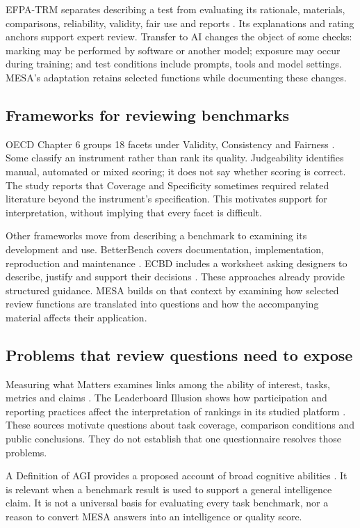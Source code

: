 \documentclass[10pt,conference]{IEEEtran}
\begin{document}
EFPA-TRM separates describing a test from evaluating its rationale, materials, comparisons, reliability, validity, fair use and reports \cite{efpa_test_review_model_2025}. Its explanations and rating anchors support expert review. Transfer to AI changes the object of some checks: marking may be performed by software or another model; exposure may occur during training; and test conditions include prompts, tools and model settings. MESA's adaptation retains selected functions while documenting these changes.

\subsection{Frameworks for reviewing benchmarks}
OECD Chapter 6 groups 18 facets under Validity, Consistency and Fairness \cite{cohn_hernandez_orallo_oecd_2023}. Some classify an instrument rather than rank its quality. Judgeability identifies manual, automated or mixed scoring; it does not say whether scoring is correct. The study reports that Coverage and Specificity sometimes required related literature beyond the instrument's specification. This motivates support for interpretation, without implying that every facet is difficult.

Other frameworks move from describing a benchmark to examining its development and use. BetterBench covers documentation, implementation, reproduction and maintenance \cite{reuel_betterbench}. ECBD includes a worksheet asking designers to describe, justify and support their decisions \cite{liu_ecbd_2024}. These approaches already provide structured guidance. MESA builds on that context by examining how selected review functions are translated into questions and how the accompanying material affects their application.

\subsection{Problems that review questions need to expose}
Measuring what Matters examines links among the ability of interest, tasks, metrics and claims \cite{bean_measuring_what_matters}. The Leaderboard Illusion shows how participation and reporting practices affect the interpretation of rankings in its studied platform \cite{singh_leaderboard_illusion}. These sources motivate questions about task coverage, comparison conditions and public conclusions. They do not establish that one questionnaire resolves those problems.

A Definition of AGI provides a proposed account of broad cognitive abilities \cite{hendrycks_definition_agi}. It is relevant when a benchmark result is used to support a general intelligence claim. It is not a universal basis for evaluating every task benchmark, nor a reason to convert MESA answers into an intelligence or quality score.
\end{document}
